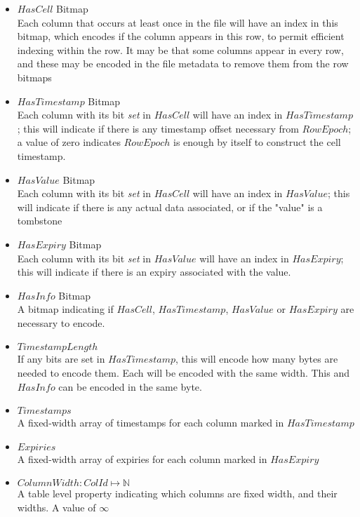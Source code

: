 \documentclass[fleqn]{article}
\begin{document}
\begin{itemize}
  \item $HasCell$ Bitmap\\[2pt]
    Each column that occurs at least once in the file will have an index in this bitmap, which encodes
    if the column appears in this row, to permit efficient indexing within the row. It may be that some
    columns appear in every row, and these may be encoded in the file metadata to remove them from the
    row bitmaps
  \item $HasTimestamp$ Bitmap\\[2pt]
    Each column with its bit \textit{set} in $HasCell$ will have an index in $HasTimestamp$; this 
    will indicate if there is any timestamp offset necessary from $RowEpoch$; a value of zero 
    indicates $RowEpoch$ is enough by itself to construct the cell timestamp.
  \item $HasValue$ Bitmap\\[2pt]
    Each column with its bit \textit{set} in $HasCell$ will have an index in $HasValue$; this 
    will indicate if there is any actual data associated, or if the "value" is a tombstone
  \item $HasExpiry$ Bitmap\\[2pt]
    Each column with its bit \textit{set} in $HasValue$ will have an index in $HasExpiry$; this 
    will indicate if there is an expiry associated with the value.
  \item $HasInfo$ Bitmap\\[2pt]
    A bitmap indicating if $HasCell$, $HasTimestamp$, $HasValue$ or $HasExpiry$ are necessary to 
    encode.
  \item $TimestampLength$\\[2pt]
    If any bits are set in $HasTimestamp$, this will encode how many bytes are needed to encode them.
    Each will be encoded with the same width. This and $HasInfo$ can be encoded in the same byte.
  \item $Timestamps$\\[2pt]
    A fixed-width array of timestamps for each column marked in $HasTimestamp$
  \item $Expiries$\\[2pt]
    A fixed-width array of expiries for each column marked in $HasExpiry$
  \item $ColumnWidth : ColId \mapsto \mathbb{N}$\\[2pt]
    A table level property indicating which columns are fixed width, and their widths. A value of $\infty$

\end{itemize}
\end{document}
